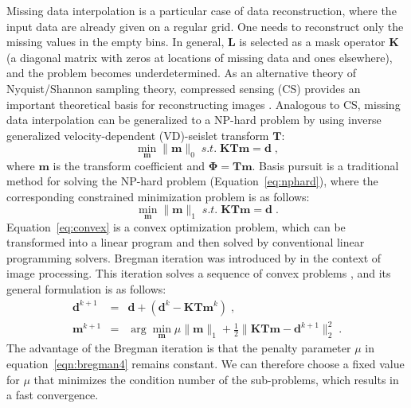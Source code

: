 Missing data interpolation is a particular case of data
reconstruction, where the input data are already given on a regular
grid. One needs to reconstruct only the missing values in the empty
bins. In general, $\mathbf{L}$ is selected as a mask operator
$\mathbf{K}$ (a diagonal matrix with zeros at locations of missing
data and ones elsewhere), and the problem becomes underdetermined. As
an alternative theory of Nyquist/Shannon sampling theory, compressed
sensing (CS) provides an important theoretical basis for
reconstructing images \cite[]{Donoho06}. Analogous to CS, missing data
interpolation can be generalized to a NP-hard problem
\cite[]{Amaldi98} by using inverse generalized
velocity-dependent (VD)-seislet transform $\mathbf{T}$:
\begin{equation}
  \label{eq:nphard}
  \min_{\mathbf{m}}\|\mathbf{m}\|_0 \; s.t.\; \mathbf{KTm} = \mathbf{d}\;,
\end{equation}
where $\mathbf{m}$ is the transform coefficient and
$\mathbf{\Phi}=\mathbf{Tm}$. Basis pursuit is a traditional method for
solving the NP-hard problem (Equation~\ref{eq:nphard}), where the
corresponding constrained minimization problem is as follows:
\begin{equation}
  \label{eq:convex}
  \min_{\mathbf{m}}\|\mathbf{m}\|_1 \; s.t.\; \mathbf{KTm} = \mathbf{d}\;.
\end{equation}
Equation~\ref{eq:convex} is a convex optimization problem, which can
be transformed into a linear program and then solved by conventional
linear programming solvers. Bregman iteration was introduced by
\cite{Osher05} in the context of image processing. This iteration 
solves a sequence of convex problems
\cite[]{Yin08}, and its general formulation is as follows:
\begin{eqnarray}
  \label{eqn:bregman3} 
  \mathbf{d}^{k+1}&=&\mathbf{d}+(\mathbf{d}^k-\mathbf{KT}\mathbf{m}^{k})\;,\\
  \label{eqn:bregman4}
  \mathbf{m}^{k+1}&=&\arg\min_{\mathbf{m}}
  \mu\|\mathbf{m}\|_1+ \frac{1}{2}\|\mathbf{KTm}-\mathbf{d}^{k+1}\|_2^2\;.
\end{eqnarray}
The advantage of the Bregman iteration is that the penalty parameter $\mu$
in equation~\ref{eqn:bregman4} remains constant. We can therefore
choose a fixed value for $\mu$ that minimizes the condition number of
the sub-problems, which results in a fast convergence.

